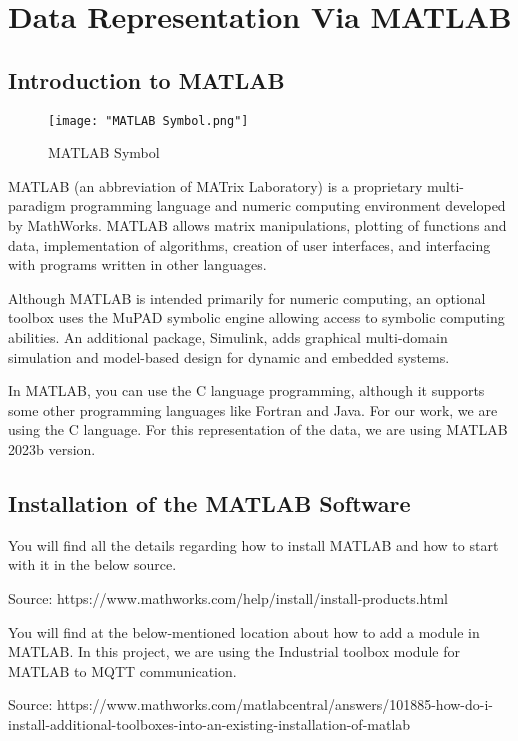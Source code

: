 \documentclass{article}
\begin{document}
	
	\section{Data Representation Via MATLAB}
	
	\subsection{Introduction to MATLAB}
	
	\begin{figure}[h]
		\centering
		\texttt{[image: "MATLAB Symbol.png"]}
		\caption{MATLAB Symbol}
	\end{figure}
	
	MATLAB (an abbreviation of MATrix Laboratory) is a proprietary multi-paradigm programming language and numeric computing environment developed by MathWorks. MATLAB allows matrix manipulations, plotting of functions and data, implementation of algorithms, creation of user interfaces, and interfacing with programs written in other languages.
	
	Although MATLAB is intended primarily for numeric computing, an optional toolbox uses the MuPAD symbolic engine allowing access to symbolic computing abilities. An additional package, Simulink, adds graphical multi-domain simulation and model-based design for dynamic and embedded systems.
	
	In MATLAB, you can use the C language programming, although it supports some other programming languages like Fortran and Java. For our work, we are using the C language. For this representation of the data, we are using MATLAB 2023b version.
	
	\subsection{Installation of the MATLAB Software}
	
	You will find all the details regarding how to install MATLAB and how to start with it in the below source.
	
	Source: {https://www.mathworks.com/help/install/install-products.html}
	
	You will find at the below-mentioned location about how to add a module in MATLAB. In this project, we are using the Industrial toolbox module for MATLAB to MQTT communication.
	
	Source: {https://www.mathworks.com/matlabcentral/answers/101885-how-do-i-install-additional-toolboxes-into-an-existing-installation-of-matlab}
	
\end{document}
